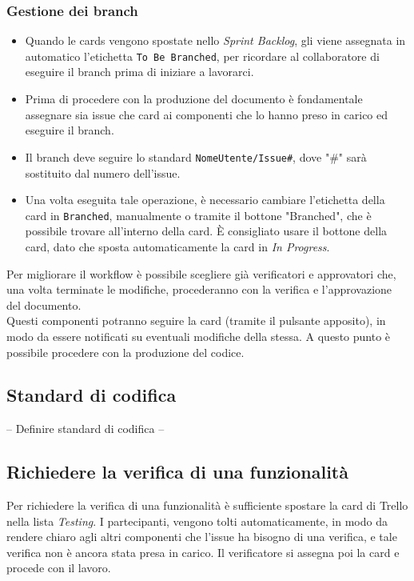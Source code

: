 \subsubsection{Gestione dei branch}
\begin{itemize}
    \item Quando le cards vengono spostate nello \textit{Sprint Backlog}, gli viene assegnata in automatico l'etichetta \texttt{To Be Branched}, per ricordare al collaboratore di eseguire il branch prima di iniziare a lavorarci.
    \item Prima di procedere con la produzione del documento è fondamentale assegnare sia issue che card ai componenti che lo hanno preso in carico ed eseguire il branch.
    \item Il branch deve seguire lo standard \texttt{NomeUtente/Issue\#}, dove "\#" sarà sostituito dal numero dell'issue.
    \item Una volta eseguita tale operazione, è necessario cambiare l'etichetta della card in \texttt{Branched}, manualmente o tramite il bottone "Branched", che è possibile trovare all'interno della card. È consigliato usare il bottone della card, dato che sposta automaticamente la card in \textit{In Progress}.
\end{itemize}
Per migliorare il workflow è possibile scegliere già verificatori e approvatori che, una volta terminate le modifiche, procederanno con la verifica e l'approvazione del documento.\\ 
Questi componenti potranno seguire la card (tramite il pulsante apposito), in modo da essere notificati su eventuali modifiche della stessa.
A questo punto è possibile procedere con la produzione del codice.
\subsection{Standard di codifica}
-- Definire standard di codifica --\\

\subsection{Richiedere la verifica di una funzionalità}
Per richiedere la verifica di una funzionalità è sufficiente spostare la card di Trello nella lista \textit{Testing}. I partecipanti, vengono tolti automaticamente, in modo da rendere chiaro agli altri componenti che l'issue ha bisogno di una verifica, e tale verifica non è ancora stata presa in carico. Il verificatore si assegna poi la card e procede con il lavoro.

